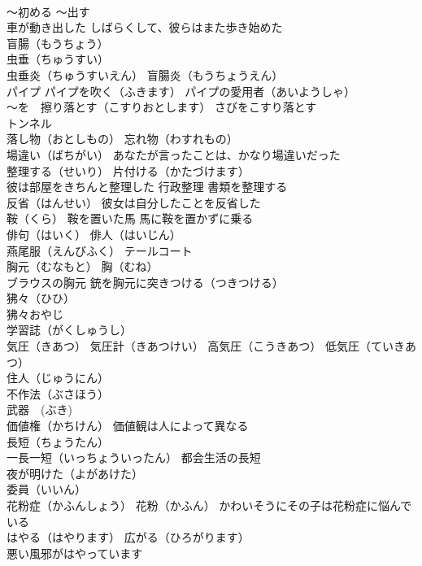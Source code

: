 \documentclass[8pt]{extreport}
\begin{document}
\begin{CJK}{UTF8}{min}
\\	～初める ～出す 
\\	車が動き出した しばらくして、彼らはまた歩き始めた
\\	盲腸（もうちょう）
\\	虫垂（ちゅうすい）
\\	虫垂炎（ちゅうすいえん） 盲腸炎（もうちょうえん）
\\	パイプ パイプを吹く（ふきます） パイプの愛用者（あいようしゃ）
\\	～を　擦り落とす（こすりおとします） さびをこすり落とす
\\	トンネル
\\	落し物（おとしもの） 忘れ物（わすれもの）
\\	場違い（ばちがい） あなたが言ったことは、かなり場違いだった
\\	整理する（せいり） 片付ける（かたづけます）
\\	彼は部屋をきちんと整理した 行政整理 書類を整理する
\\	反省（はんせい） 彼女は自分したことを反省した
\\	鞍（くら） 鞍を置いた馬 馬に鞍を置かずに乗る
\\	俳句（はいく） 俳人（はいじん）
\\	燕尾服（えんびふく） テールコート
\\	胸元（むなもと） 胸（むね）
\\	ブラウスの胸元 銃を胸元に突きつける（つきつける）
\\	狒々（ひひ）
\\	狒々おやじ
\\	学習誌（がくしゅうし）
\\	気圧（きあつ） 気圧計（きあつけい） 高気圧（こうきあつ） 低気圧（ていきあつ）
\\	住人（じゅうにん）
\\	不作法（ぶさほう）
\\	武器　(ぶき)
\\	価値権（かちけん） 価値観は人によって異なる
\\	長短（ちょうたん） 
\\	一長一短（いっちょういったん） 都会生活の長短
\\	夜が明けた（よがあけた）
\\	委員（いいん）
\\	花粉症（かふんしょう） 花粉（かふん） かわいそうにその子は花粉症に悩んでいる
\\	はやる（はやります） 広がる（ひろがります）
\\	悪い風邪がはやっています

\end{CJK}
\end{document}
